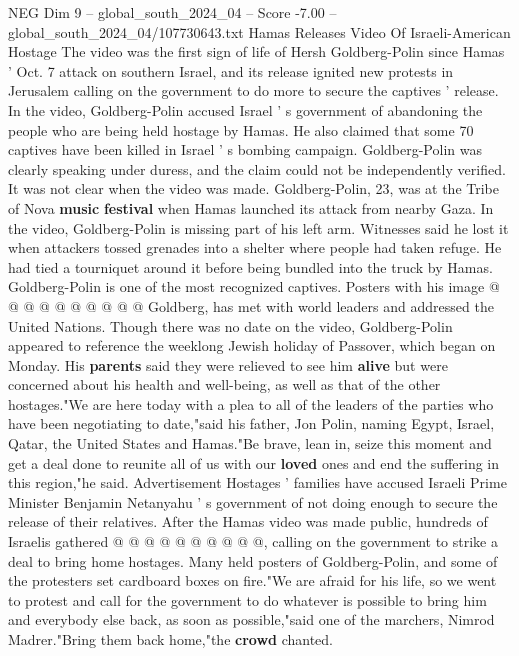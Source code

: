 \begin{textsample}{NEG Dim 9 – global\_south\_2024\_04 – Score -7.00 – global\_south\_2024\_04/107730643.txt}  \label{ex:f9_neg_321}
Hamas Releases Video Of Israeli-American Hostage The video was the first sign of life of Hersh Goldberg-Polin since Hamas ' Oct. 7 attack on southern Israel, and its release ignited new protests in Jerusalem calling on the government to do more to secure the captives ' release.
In the video, Goldberg-Polin accused Israel ' s government of abandoning the people who are being held hostage by Hamas.
He also claimed that some 70 captives have been killed in Israel ' s bombing campaign.
Goldberg-Polin was clearly speaking under duress, and the claim could not be independently verified.
It was not clear when the video was made.
Goldberg-Polin, 23, was at the Tribe of Nova \textbf{music} \textbf{festival} when Hamas launched its attack from nearby Gaza.
In the video, Goldberg-Polin is missing part of his left arm.
Witnesses said he lost it when attackers tossed grenades into a shelter where people had taken refuge.
He had tied a tourniquet around it before being bundled into the truck by Hamas.
Goldberg-Polin is one of the most recognized captives.
Posters with his image @ @ @ @ @ @ @ @ @ @ Goldberg, has met with world leaders and addressed the United Nations.
Though there was no date on the video, Goldberg-Polin appeared to reference the weeklong Jewish holiday of Passover, which began on Monday.
His \textbf{parents} said they were relieved to see him \textbf{alive} but were concerned about his health and well-being, as well as that of the other hostages."We are here today with a plea to all of the leaders of the parties who have been negotiating to date,"said his father, Jon Polin, naming Egypt, Israel, Qatar, the United States and Hamas."Be brave, lean in, seize this moment and get a deal done to reunite all of us with our \textbf{loved} ones and end the suffering in this region,"he said.
Advertisement Hostages ' families have accused Israeli Prime Minister Benjamin Netanyahu ' s government of not doing enough to secure the release of their relatives.
After the Hamas video was made public, hundreds of Israelis gathered @ @ @ @ @ @ @ @ @ @, calling on the government to strike a deal to bring home hostages.
Many held posters of Goldberg-Polin, and some of the protesters set cardboard boxes on fire."We are afraid for his life, so we went to protest and call for the government to do whatever is possible to bring him and everybody else back, as soon as possible,"said one of the marchers, Nimrod Madrer."Bring them back home,"the \textbf{crowd} chanted.

\end{textsample}
